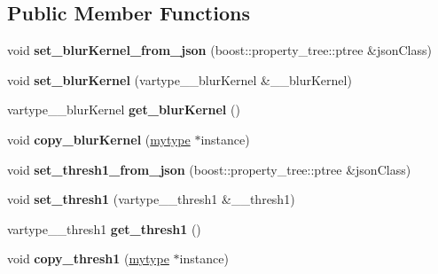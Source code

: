 \subsection*{Public Member Functions}
\begin{DoxyCompactItemize}
\item 
\mbox{\label{classfilter_1_1_algos_1_1_canny_a415c04c679c4fd67599332e6dfdfbd97}} 
void {\bfseries set\+\_\+blur\+Kernel\+\_\+from\+\_\+json} (boost\+::property\+\_\+tree\+::ptree \&json\+Class)
\item 
\mbox{\label{classfilter_1_1_algos_1_1_canny_a980c9ffdd9ccfb2a1163cff05690ab75}} 
void {\bfseries set\+\_\+blur\+Kernel} (vartype\+\_\+\+\_\+blur\+Kernel \&\+\_\+\+\_\+blur\+Kernel)
\item 
\mbox{\label{classfilter_1_1_algos_1_1_canny_a28f904d59c5e5327a7d69bcbc9d1b5d6}} 
vartype\+\_\+\+\_\+blur\+Kernel {\bfseries get\+\_\+blur\+Kernel} ()
\item 
\mbox{\label{classfilter_1_1_algos_1_1_canny_a75294ab8de76fd7751713d12db806d26}} 
void {\bfseries copy\+\_\+blur\+Kernel} (\hyperlink{classfilter_1_1_algos_1_1_canny}{mytype} $\ast$instance)
\item 
\mbox{\label{classfilter_1_1_algos_1_1_canny_a8f9b7b30c6a02a8851914be4af6e8687}} 
void {\bfseries set\+\_\+thresh1\+\_\+from\+\_\+json} (boost\+::property\+\_\+tree\+::ptree \&json\+Class)
\item 
\mbox{\label{classfilter_1_1_algos_1_1_canny_a85e52973f0d094a9371f865132a2052d}} 
void {\bfseries set\+\_\+thresh1} (vartype\+\_\+\+\_\+thresh1 \&\+\_\+\+\_\+thresh1)
\item 
\mbox{\label{classfilter_1_1_algos_1_1_canny_a83c3b6077acb089393323637e14ec557}} 
vartype\+\_\+\+\_\+thresh1 {\bfseries get\+\_\+thresh1} ()
\item 
\mbox{\label{classfilter_1_1_algos_1_1_canny_ab13aa4863bd252c5be652ad0c6e32848}} 
void {\bfseries copy\+\_\+thresh1} (\hyperlink{classfilter_1_1_algos_1_1_canny}{mytype} $\ast$instance)

\end{DoxyCompactItemize}
